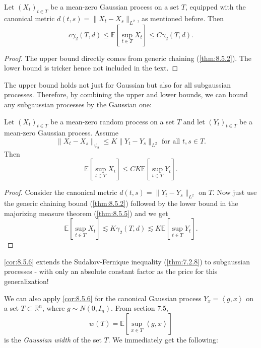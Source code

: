 \begin{theorem}
\label{thm:8.5.5}
Let $(X_t)_{t \in T}$ be a mean-zero Gaussian process on a set $T$, equipped with the canonical metric 
$d(t, s) = \lVert X_t - X_s \rVert_{L^2}$, as mentioned before. Then 
\[ c \gamma_2(T, d) \leq \mathbb{E}\left[ \sup_{t \in T}X_t \right] \leq C \gamma_2(T, d). \]
\end{theorem}

\begin{proof}
The upper bound directly comes from generic chaining (\cref{thm:8.5.2}). The lower bound is tricker hence not 
included in the text.
\end{proof}

The upper bound holds not just for Gaussian but also for all subgaussian processes. Therefore, by combining the 
upper and lower bounds, we can bound any subgaussian processes by the Gaussian one:

\begin{corollary}
\label{cor:8.5.6}
Let $(X_t)_{t \in T}$ be a mean-zero random process on a set $T$ and let $(Y_t)_{t \in T}$ be a mean-zero 
Gaussian process. Assume 
\[ \lVert X_t - X_s \rVert_{\psi_2} \leq K \lVert Y_t - Y_s \rVert_{L^2} \text{ for all } t, s \in T. \]
Then 
\[ \mathbb{E}\left[ \sup_{t \in T}X_t \right] \leq CK \mathbb{E}\left[ \sup_{t \in T}Y_t \right]. \]
\end{corollary}

\begin{proof}
Consider the canonical metric $d(t, s) = \lVert Y_t - Y_s \rVert_{L^2}$ on $T$. Now just use the generic 
chaining bound (\cref{thm:8.5.2}) followed by the lower bound in the majorizing measure theorem 
(\cref{thm:8.5.5}) and we get 
\[ \mathbb{E}\left[ \sup_{t \in T}X_t \right] \lesssim K \gamma_2(T, d) \lesssim 
K \mathbb{E}\left[ \sup_{t \in T}Y_t \right]. \]
\end{proof}

\begin{remark}
\label{rmk:8.5.7}
\cref{cor:8.5.6} extends the Sudakov-Fernique inequality (\cref{thm:7.2.8}) to subgaussian processes - with 
only an absolute constant factor as the price for this generalization!
\end{remark}

We can also apply \cref{cor:8.5.6} for the canonical Gaussian process $Y_x = \left\langle g, x \right\rangle$ on 
a set $T \subset \mathbb{R}^n$, where $g \sim N(0, I_n)$. From section 7.5, 
\[ w(T) = \mathbb{E}\left[ \sup_{x \in T}\left\langle g, x \right\rangle \right] \]
is the \textit{Gaussian width} of the set $T$. We immediately get the following:

